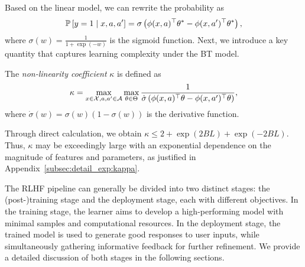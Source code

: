 Based on the linear model, we can rewrite the probability as
\begin{align}
    \label{eq:linear-BT}
    \P\left[y=1 \mid x, a, a^{\prime}\right] = \sigma\left(\phi(x, a)^\top \theta^* - \phi(x, a')^\top \theta^* \right),
\end{align}
where $\sigma(w) = \frac{1}{1 + \exp(-w)}$ is the sigmoid function. Next, we introduce a key quantity that captures learning complexity under the BT model.
\begin{myDef}
    \label{def:kappa}
    The \emph{non-linearity coefficient} $\kappa$ is defined as
    \begin{align}
        \kappa = \max_{x \in \X, a, a' \in \A} \max_{\theta \in \Theta} \frac{1}{\dot{\sigma}\left(\phi(x, a)^\top \theta - \phi(x, a')^\top \theta\right)},
        \label{eq:kappa}
    \end{align}
    where $\dot{\sigma}(w) = \sigma(w)(1 - \sigma(w))$ is the derivative function.
\end{myDef}

\begin{myRemark}
    \label{rmk:kappa}
    Through direct calculation, we obtain $\kappa \leq 2 + \exp(2BL) + \exp(-2BL)$. Thus, $\kappa$ may be exceedingly large with an exponential dependence on the magnitude of features and parameters, as justified in Appendix~\ref{subsec:detail_exp:kappa}.
\end{myRemark}

The RLHF pipeline can generally be divided into two distinct stages: the (post-)training stage and the deployment stage, each with different objectives. In the training stage, the learner aims to develop a high-performing model with minimal samples and computational resources. In the deployment stage, the trained model is used to generate good responses to user inputs, while simultaneously gathering informative feedback for further refinement. We provide a detailed discussion of both stages in the following sections.
